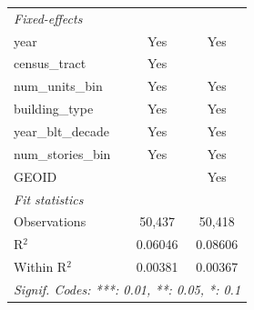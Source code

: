 \begin{tabular}{lcc}
   \midrule
   \emph{Fixed-effects}\\
   year                                                  & Yes             & Yes\\  
   census\_tract                                         & Yes             & \\  
   num\_units\_bin                                       & Yes             & Yes\\  
   building\_type                                        & Yes             & Yes\\  
   year\_blt\_decade                                     & Yes             & Yes\\  
   num\_stories\_bin                                     & Yes             & Yes\\  
   GEOID                                                 &                 & Yes\\  
   \midrule
   \emph{Fit statistics}\\
   Observations                                          & 50,437          & 50,418\\  
   R$^2$                                                 & 0.06046         & 0.08606\\  
   Within R$^2$                                          & 0.00381         & 0.00367\\  
   \midrule \midrule
   \multicolumn{3}{l}{\emph{Signif. Codes: ***: 0.01, **: 0.05, *: 0.1}}\\
\end{tabular}
\par\endgroup
